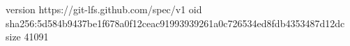 version https://git-lfs.github.com/spec/v1
oid sha256:5d584b9437be1f678a0f12ceac91993939261a0c726534ed8fdb4353487d12dc
size 41091
